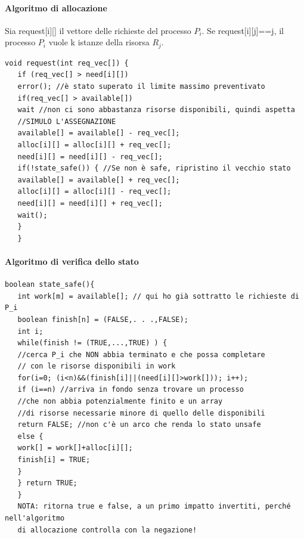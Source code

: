 \documentclass[a4paper]{article}
\begin{document}
\paragraph{Algoritmo di allocazione}
Sia request[i][] il vettore delle richieste del processo $P_i$. Se request[i][j]==j, il processo $P_i$ vuole k istanze della risorsa $R_j$. \begin{Verbatim}[tabsize=4]
   void request(int req_vec[]) {
   if (req_vec[] > need[i][])
   error(); //è stato superato il limite massimo preventivato
   if(req_vec[] > available[])
   wait //non ci sono abbastanza risorse disponibili, quindi aspetta
   //SIMULO L'ASSEGNAZIONE
   available[] = available[] - req_vec[];
   alloc[i][] = alloc[i][] + req_vec[];
   need[i][] = need[i][] - req_vec[];
   if(!state_safe()) { //Se non è safe, ripristino il vecchio stato
   available[] = available[] + req_vec[];
   alloc[i][] = alloc[i][] - req_vec[];
   need[i][] = need[i][] + req_vec[];
   wait();
   }
   }
\end{Verbatim}
\newpage
\paragraph{Algoritmo di verifica dello stato}
\begin{Verbatim}[tabsize=4]
   boolean state_safe(){
   int work[m] = available[]; // qui ho già sottratto le richieste di P_i
   boolean finish[n] = (FALSE,. . .,FALSE);
   int i;
   while(finish != (TRUE,...,TRUE) ) {
   //cerca P_i che NON abbia terminato e che possa completare
   // con le risorse disponibili in work
   for(i=0; (i<n)&&(finish[i]||(need[i][]>work[])); i++);
   if (i==n) //arriva in fondo senza trovare un processo
   //che non abbia potenzialmente finito e un array
   //di risorse necessarie minore di quello delle disponibili
   return FALSE; //non c'è un arco che renda lo stato unsafe
   else {
   work[] = work[]+alloc[i][];
   finish[i] = TRUE;
   }
   } return TRUE;
   }
   NOTA: ritorna true e false, a un primo impatto invertiti, perché nell'algoritmo
   di allocazione controlla con la negazione!
\end{Verbatim}
\end{document}
